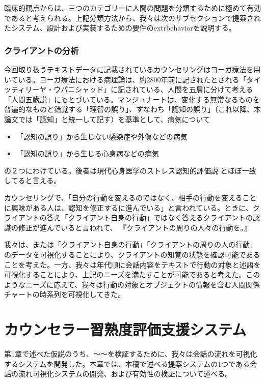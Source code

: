 \documentclass[shuuron]{kuee}
\begin{document}
 臨床的観点からは、三つのカテゴリーに人間の問題を分類するために極めて有効であると考えられる。上記分類方法から、我々は次のサブセクションで提案されたシステム、設計および実装するための要件のextrbehaviorを説明する。
\subsection{クライアントの分析}

今回取り扱うテキストデータに記載されているカウンセリングはヨーガ療法を用いている。ヨーガ療法における病理論は、約2800年前に記されたとされる「タイッティリーヤ・ウパニシャッド」に記されている、人間を五層に分けて考える「人間五臓説」にもとづいている\cite{kimura}。マンジュナート\cite{manjunath}は、変化する無常なるものを普遍的なものと錯覚する「理智の誤り」、すなわち「認知の誤り」（これ以降、本論文では「認知」と統一して記す）を基準として、病気について
\begin{itemize}
\item 「認知の誤り」から生じない感染症や外傷などの病気
\item 「認知の誤り」から生じる心身病などの病気
\end{itemize}
の２つにわけている。後者は現代心身医学のストレス認知的評価説
\cite{Lazarus}とほぼ一致してると言える\cite{Darshana}。


 カウンセリングで、「自分の行動を変えるのではなく、相手の行動を変えることに興味がある人は、認知を修正するに進んでいる」と言われている。ときに、クライアントの答え「クライアント自身の行動」ではなく答えるクライアントの認識の修正が進んでいると言われて、 『クライアントの周りの人々の行動を。』

 我々は、または「クライアント自身の行動」「クライアントの周りの人の行動」のデータを可視化することにより、クライアントの知覚の状態を確認可能であることを考えた。一方、我々は年代順に会話内容をテキストで行動の対象と述語を可視化することにより、上記のニーズを満たすことが可能であると考えた。このようなニーズに応えて、我々は行動の対象とオブジェクトの情報を含む人間関係チャートの時系列を可視化してきた。



\chapter{カウンセラー習熟度評価支援システム}





第1章で述べた仮説のうち、〜〜を検証するために、我々は会話の流れを可視化するシステムを開発した。本章では、本稿で述べる提案システムの1つである会話の流れ可視化システムの開発、および有効性の検証について述べる。
\end{document}
